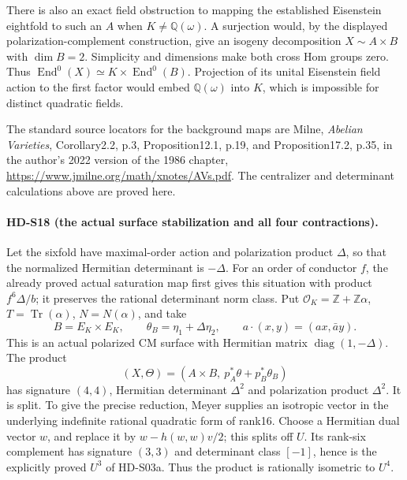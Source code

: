 There is also an exact field obstruction to mapping the established
Eisenstein eightfold to such an \(A\) when \(K\ne\mathbb Q(\omega)\).
A surjection would, by the displayed polarization-complement
construction, give an isogeny decomposition \(X\sim A\times B\)
with \(\dim B=2\). Simplicity and dimensions make both cross Hom
groups zero. Thus
\(\operatorname{End}^0(X)\simeq K\times\operatorname{End}^0(B)\).
Projection of its unital Eisenstein field action to the first factor
would embed \(\mathbb Q(\omega)\) into \(K\), which is impossible
for distinct quadratic fields.

The standard source locators for the background maps are Milne,
\emph{Abelian Varieties}, Corollary2.2, p.3, Proposition12.1, p.19,
and Proposition17.2, p.35, in the author's 2022 version of the 1986
chapter, \url{https://www.jmilne.org/math/xnotes/AVs.pdf}.
The centralizer and determinant calculations above are proved here.

\paragraph{HD-S18 (the actual surface stabilization and all four contractions).}
Let the sixfold have maximal-order action and polarization product
\(\Delta\), so that the normalized Hermitian determinant is
\(-\Delta\). For an order of conductor \(f\), the already proved
actual saturation map first gives this situation with product
\(f^6\Delta/b\); it preserves the rational determinant norm class.
Put \(\mathcal O_K=\mathbb Z+\mathbb Z\alpha\),
\(T=\operatorname{Tr}(\alpha)\), \(N=N(\alpha)\), and take
\[
 B=E_K\times E_K,\qquad
 \theta_B=\eta_1+\Delta\eta_2,
 \qquad a\cdot(x,y)=(ax,\bar a y).
\]
This is an actual polarized CM surface with Hermitian matrix
\(\operatorname{diag}(1,-\Delta)\). The product
\[
 (X,\Theta)=(A\times B,\ p_A^*\theta+p_B^*\theta_B)
                                                               \tag{S18.1}
\]
has signature \((4,4)\), Hermitian determinant \(\Delta^2\)
and polarization product \(\Delta^2\). It is split. To give the
precise reduction, Meyer supplies an isotropic vector in the
underlying indefinite rational quadratic form of rank16. Choose
a Hermitian dual vector \(w\), and replace it by
\(w-h(w,w)v/2\); this splits off \(U\). Its rank-six complement
has signature \((3,3)\) and determinant class \([-1]\), hence
is the explicitly proved \(U^3\) of HD-S03a. Thus the product
is rationally isometric to \(U^4\).

